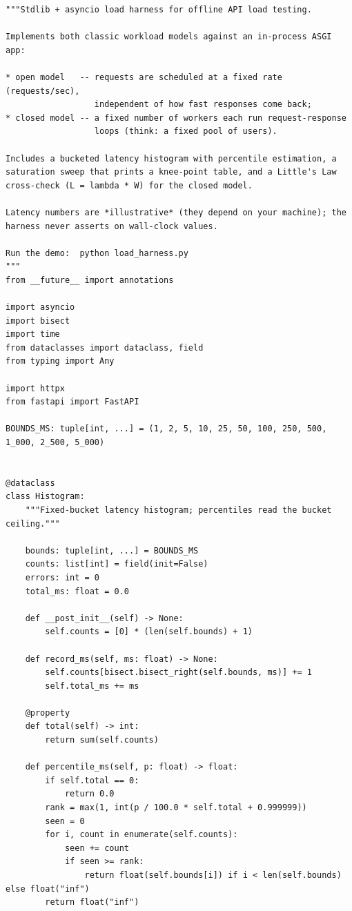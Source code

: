 \begin{verbatim}
"""Stdlib + asyncio load harness for offline API load testing.

Implements both classic workload models against an in-process ASGI app:

* open model   -- requests are scheduled at a fixed rate (requests/sec),
                  independent of how fast responses come back;
* closed model -- a fixed number of workers each run request-response
                  loops (think: a fixed pool of users).

Includes a bucketed latency histogram with percentile estimation, a
saturation sweep that prints a knee-point table, and a Little's Law
cross-check (L = lambda * W) for the closed model.

Latency numbers are *illustrative* (they depend on your machine); the
harness never asserts on wall-clock values.

Run the demo:  python load_harness.py
"""
from __future__ import annotations

import asyncio
import bisect
import time
from dataclasses import dataclass, field
from typing import Any

import httpx
from fastapi import FastAPI

BOUNDS_MS: tuple[int, ...] = (1, 2, 5, 10, 25, 50, 100, 250, 500, 1_000, 2_500, 5_000)


@dataclass
class Histogram:
    """Fixed-bucket latency histogram; percentiles read the bucket ceiling."""

    bounds: tuple[int, ...] = BOUNDS_MS
    counts: list[int] = field(init=False)
    errors: int = 0
    total_ms: float = 0.0

    def __post_init__(self) -> None:
        self.counts = [0] * (len(self.bounds) + 1)

    def record_ms(self, ms: float) -> None:
        self.counts[bisect.bisect_right(self.bounds, ms)] += 1
        self.total_ms += ms

    @property
    def total(self) -> int:
        return sum(self.counts)

    def percentile_ms(self, p: float) -> float:
        if self.total == 0:
            return 0.0
        rank = max(1, int(p / 100.0 * self.total + 0.999999))
        seen = 0
        for i, count in enumerate(self.counts):
            seen += count
            if seen >= rank:
                return float(self.bounds[i]) if i < len(self.bounds) else float("inf")
        return float("inf")


\end{verbatim}
